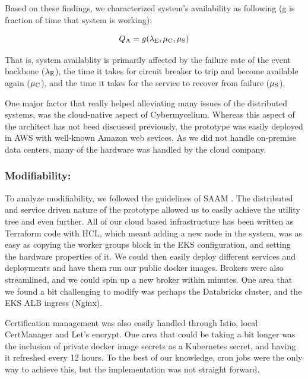 \documentclass[review]{elsarticle}
\begin{document}
Based on these findings, we characterized system's availability as following (g is fraction of time that system is working);

\begin{equation}
    Q\textsubscript{A} = g(\lambda\textsubscript{E} , \mu\textsubscript{C}, \mu\textsubscript{S})
\end{equation}

That is, system availablity is primarily affected by the failure rate of the event backbone ($\lambda \textsubscript{E}$), the time it takes for circuit breaker to trip and become available again ($\mu\textsubscript{C}$), and the time it takes for the service to recover from failure ($\mu\textsubscript{S}$).

One major factor that really helped alleviating many issues of the distributed systems, was the cloud-native aspect of Cybermycelium. Whereas this aspect of the architect has not beed discussed previously, the prototype was easily deployed in AWS with well-known Amazon web sevices. As we did not handle on-premise data centers, many of the hardware was handled by the cloud company.

\subsubsection{Modifiability:}

To analyze modifiability, we followed the guidelines of SAAM \cite{kazman1994saam}. The distributed and service driven nature of the prototype allowed us to easily achieve the utility tree and even further. All of our cloud based infrastructure has been written as Terraform code with HCL, which meant adding a new node in the system, was as easy as copying the worker groups block in the EKS configuration, and setting the hardware properties of it. We could then easily deploy different services and deployments and have them run our public docker images. Brokers were also streamlined, and we could spin up a new broker within minutes. One area that we found a bit challenging to modify was perhaps the Databricks cluster, and the EKS ALB ingress (Nginx).

Certification management was also easily handled through Istio, local CertManager and Let's encrypt. One area that could be taking a bit longer was the inclusion of private docker image secrets as a Kubernetes secret, and having it refreshed every 12 hours. To the best of our knowledge, cron jobs were the only way to achieve this, but the implementation was not straight forward.
\end{document}
